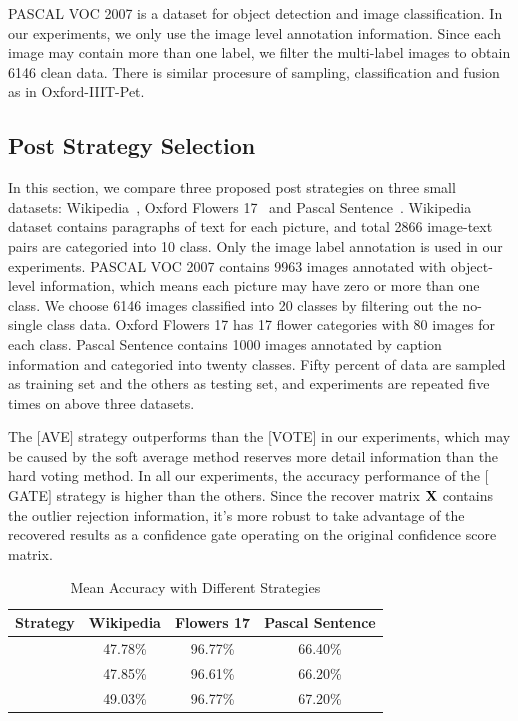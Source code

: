 \documentclass[letterpaper]{article}
\def\bX{{\bf X}}
\def\bX{{\bf X}}
\begin{document}
PASCAL VOC 2007 is a dataset for object detection and image classification.
In our experiments, we only use the image level annotation information.
Since each image may contain more than one label, we filter the multi-label images to obtain 6146 clean data.
There is similar procesure of sampling, classification and fusion as in Oxford-IIIT-Pet.



\subsection{Post Strategy Selection}

In this section, we compare three proposed post strategies on three small datasets: Wikipedia~\cite{rasiwasia2010new}, Oxford Flowers 17~\cite{nilsback2006visual} and Pascal Sentence~\cite{Li2006One}.
Wikipedia dataset contains paragraphs of text for each picture, and total 2866 image-text pairs are categoried into 10 class.
Only the image label annotation is used in our experiments.
PASCAL VOC 2007 contains 9963 images annotated with object-level information, which means each picture may have zero or more than one class.
We choose 6146 images classified into 20 classes by filtering out the no-single class data.
Oxford Flowers 17 has 17 flower categories with 80 images for each class.
Pascal Sentence contains 1000 images annotated by caption information and categoried into twenty classes.
Fifty percent of data are sampled as training set and the others as testing set, and experiments are repeated five times on above three datasets.

The $[$AVE$]$ strategy outperforms than the $[$VOTE$]$ in our experiments, which may be caused by the soft average method reserves more detail information than the hard voting method.
In all our experiments, the accuracy performance of the $[$GATE$]$ strategy is higher than the others.
Since the recover matrix $\bX$ contains the outlier rejection information,
it's more robust to take advantage of the recovered results as a confidence gate operating on the original confidence score matrix.

\begin{table}[h]
\centering
\begin{scriptsize}
\caption{Mean Accuracy with Different Strategies}
\begin{tabular}{c|c|c|c}
\hline
Strategy            & Wikipedia & Flowers 17 & Pascal Sentence \\\hline
[AVE]               & 47.78\%   & 96.77\%    &   66.40\%       \\\hline
[VOTE]              & 47.85\%   & 96.61\%    &   66.20\%       \\\hline
[GATE]              & 49.03\%   & 96.77\%    &   67.20\%       \\
\hline
\end{tabular}
\end{scriptsize}
\label{table:strategy}
\end{table}
\end{document}
